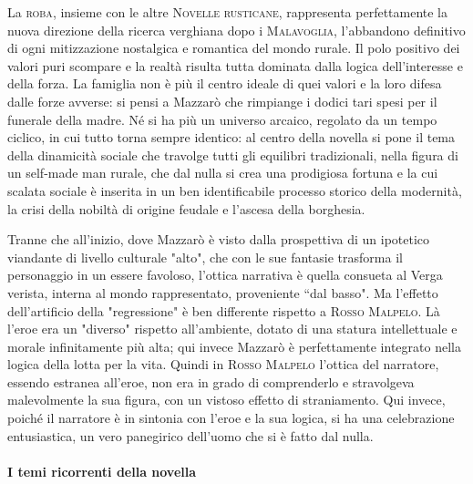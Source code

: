 \documentclass{book}
\begin{document}
La \textsc{roba}, insieme con le altre \textsc{Novelle rusticane}, rappresenta perfettamente la nuova direzione della ricerca verghiana dopo i \textsc{Malavoglia}, l'abbandono definitivo di ogni mitizzazione nostalgica e romantica del mondo rurale. Il polo positivo dei valori puri scompare e la realtà risulta tutta dominata dalla logica dell'interesse e della forza. La famiglia non è più il centro ideale di quei valori e la loro difesa dalle forze avverse: si pensi a Mazzarò che rimpiange i dodici tari spesi per il funerale della madre. Né si ha più un universo arcaico, regolato da un tempo ciclico, in cui tutto torna sempre identico: al centro della novella si pone il tema della dinamicità sociale che travolge tutti gli equilibri tradizionali, nella figura di un self-made man rurale, che dal nulla si crea una prodigiosa fortuna e la cui scalata sociale è inserita in un ben identificabile processo storico della modernità, la crisi della nobiltà di origine feudale e l'ascesa della borghesia.

Tranne che all'inizio, dove Mazzarò è visto dalla prospettiva di un ipotetico viandante di livello culturale "alto", che con le sue fantasie trasforma il personaggio in un essere favoloso, l'ottica narrativa è quella consueta al Verga verista, interna al mondo rappresentato, proveniente ``dal basso". Ma l'effetto dell'artificio della "regressione" è ben differente rispetto a \textsc{Rosso Malpelo}. Là l'eroe era un "diverso" rispetto all'ambiente, dotato di una statura intellettuale e morale infinitamente più alta; qui invece Mazzarò è perfettamente integrato nella logica della lotta per la vita. Quindi in \textsc{Rosso Malpelo} l'ottica del narratore, essendo estranea all'eroe, non era in grado di comprenderlo e stravolgeva malevolmente la sua figura, con un vistoso effetto di straniamento. Qui invece, poiché il narratore è in sintonia con l'eroe e la sua logica, si ha una celebrazione entusiastica, un vero panegirico dell'uomo che si è fatto dal nulla.

\paragraph{I temi ricorrenti della novella}
\end{document}
